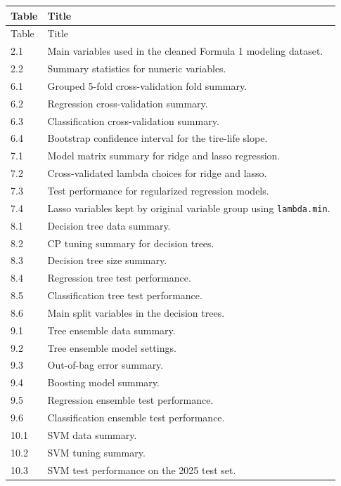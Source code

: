 \documentclass[11pt,oneside,openany]{book}
\begin{document}
\begingroup
\small
\setlength{\tabcolsep}{4pt}
\begin{longtable}{p{}p{}}
\toprule
Table & Title\\
\midrule
\endfirsthead

\toprule
Table & Title\\
\midrule
\endhead

\bottomrule
\endlastfoot

2.1 & Main variables used in the cleaned Formula 1 modeling dataset.\\
2.2 & Summary statistics for numeric variables.\\
6.1 & Grouped 5-fold cross-validation fold summary.\\
6.2 & Regression cross-validation summary.\\
6.3 & Classification cross-validation summary.\\
6.4 & Bootstrap confidence interval for the tire-life slope.\\
7.1 & Model matrix summary for ridge and lasso regression.\\
7.2 & Cross-validated lambda choices for ridge and lasso.\\
7.3 & Test performance for regularized regression models.\\
7.4 & Lasso variables kept by original variable group using \texttt{lambda.min}.\\
8.1 & Decision tree data summary.\\
8.2 & CP tuning summary for decision trees.\\
8.3 & Decision tree size summary.\\
8.4 & Regression tree test performance.\\
8.5 & Classification tree test performance.\\
8.6 & Main split variables in the decision trees.\\
9.1 & Tree ensemble data summary.\\
9.2 & Tree ensemble model settings.\\
9.3 & Out-of-bag error summary.\\
9.4 & Boosting model summary.\\
9.5 & Regression ensemble test performance.\\
9.6 & Classification ensemble test performance.\\
10.1 & SVM data summary.\\
10.2 & SVM tuning summary.\\
10.3 & SVM test performance on the 2025 test set.\\

\end{longtable}
\end{document}
